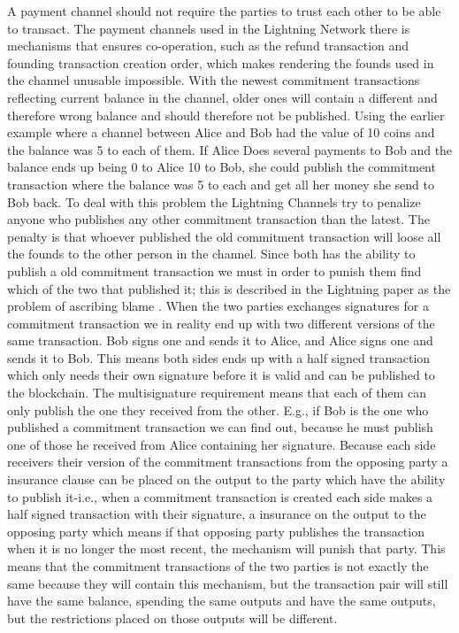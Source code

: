 A payment channel should not require the parties to trust each other to be able to transact.
The payment channels used in the Lightning Network there is mechanisms that ensures co-operation, such as the refund transaction and founding transaction creation order, which makes rendering the founds used in the channel unusable impossible. 
With the newest commitment transactions reflecting current balance in the channel, older ones will contain a different and therefore wrong balance and should therefore not be published.
Using the earlier example where a channel between Alice and Bob had the value of 10 coins and the balance was 5 to each of them. If Alice Does several payments to Bob and the balance ends up being 0 to Alice 10 to Bob, she could publish the commitment transaction where the balance was 5 to each and get all her money she send to Bob back. To deal with this problem the Lightning Channels try to penalize anyone who publishes any other commitment transaction than the latest. The penalty is that whoever published the old commitment transaction will loose all the founds to the other person in the channel.
Since both has the ability to publish a old commitment transaction we must in order to punish them find which of the two that published it; this is described in the Lightning paper as the problem of ascribing blame . When the two parties exchanges signatures for a commitment transaction we in reality end up with two different versions of the same transaction. Bob signs one and sends it to Alice, and Alice signs one and sends it to Bob. This means both sides ends up with a half signed transaction which only needs their own signature before it is valid and can be published to the blockchain. The multisignature requirement means that each of them can only publish the one they received from the other.
E.g., if Bob is the one who published a commitment transaction we can find out, because he must publish one of those he received from Alice containing her signature. Because each side receivers their version of the commitment transactions from the opposing party a insurance clause can be placed on the output to the party which have the ability to publish it-i.e., when a commitment transaction is created each side makes a half signed transaction with their signature, a insurance on the output to the opposing party which means if that opposing party publishes the transaction when it is no longer the most recent, the mechanism will punish that party. This means that the commitment transactions of the two parties is not exactly the same because they will contain this mechanism, but the transaction pair will still have the same balance, spending the same outputs and have the same outputs, but the restrictions placed on those outputs will be different.
\\

